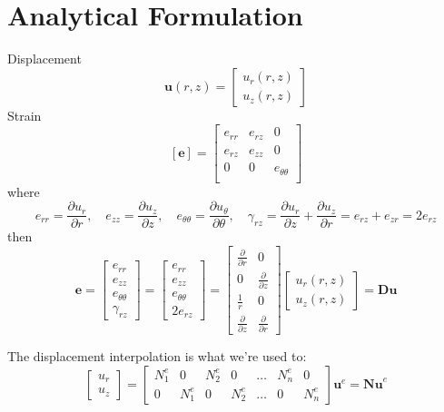 \documentclass[10pt,letterpaper]{report}
\numberwithin{equation}{chapter}
\begin{document}
\chapter{Analytical Formulation}
Displacement
\[ 
\boldsymbol{u}(r,z)= \left[  \begin{array}{c}
u_r(r,z) \\ u_z(r,z)
\end{array} \right]
\]
Strain
\[
[\boldsymbol{e}] = \left[ \begin{array}{ccc}
e_{rr} & e_{rz} & 0 \\
e_{rz} & e_{zz} & 0 \\
0 & 0 & e_{\theta \theta} \\
\end{array} \right]
\]
where
\[
e_{rr} = \frac{\partial u_r}{\partial r}, \quad 
e_{zz} = \frac{\partial u_z}{\partial z}, \quad 
e_{\theta \theta} = \frac{\partial u_\theta}{\partial \theta}, \quad 
\gamma_{rz} = \frac{\partial u_r}{\partial z} + \frac{\partial u_z}{\partial r} =
e_{rz} + e_{zr} = 2e_{rz}
\]
then
\[
\boldsymbol{e} =
\left[ \begin{array}{c} e_{rr} \\ e_{zz} \\ e_{\theta \theta} \\ \gamma_{rz} \end{array} \right] = 
\left[ \begin{array}{c} e_{rr} \\ e_{zz} \\ e_{\theta \theta} \\ 2e_{rz} \end{array} \right] = 
\left[ \begin{array}{cc} 
\frac{\partial}{\partial r} & 0 \\
0 & \frac{\partial}{\partial z} \\
\frac{1}{r} & 0 \\
\frac{\partial}{\partial z} & \frac{\partial}{\partial r} 
\end{array} \right]
\left[  \begin{array}{c}
u_r(r,z) \\ u_z(r,z)
\end{array} \right] =
\boldsymbol{Du}
\]

The displacement interpolation is what we're used to:
\[
\left[  \begin{array}{c}
u_r \\ u_z
\end{array} \right]
=
\left[  \begin{array}{ccccccc}
N^e_1 & 0 & N^e_2 & 0 & \dots & N^e_n & 0 \\
0 & N^e_1 & 0 & N^e_2 & \dots & 0 & N^e_n
\end{array} \right] 
\boldsymbol{u}^e = \boldsymbol{Nu}^e
\]
\end{document}
